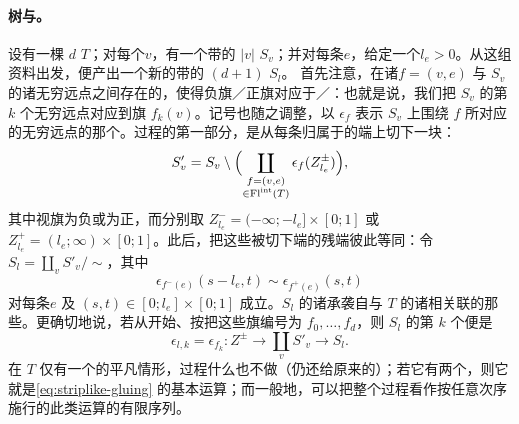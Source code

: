 \paragraph{树与\trGluing。}\label{sub:trees-gluing}
设有一棵 $d$ \trLeafedTree{}$T$；对每个\trVertex{}$v$，有一个带\trStriplikeEnd{}的
$|v|$ \trPointedDisc{}$S_v$；并对每条\trInteriorEdge{}$e$，给定一个\trGluingLength{}$l_e>0$。从这组资料出发，\trGluingConstruction{}便产出一个新的带\trStriplikeEnd{}的
$(d+1)$ \trPointedDisc{}$S_l$。
首先注意，在诸\trFlag{}$f=(v,e)$ 与 $S_v$ 的诸无穷远点之间存在\trCanonical{}的\trBijective，使得负旗／正旗对应于\trIncomingPoint{}／\trOutgoingPoint：也就是说，我们把 $S_v$ 的第 $k$ 个无穷远点对应到旗 $f_k(v)$。记号也随之调整，以 $\epsilon_f$ 表示 $S_v$ 上围绕 $f$ 所对应的无穷远点的那个\trStriplikeEnd。\trGluing{}过程的第一部分，是从每条归属于\trInteriorFlag{}的端上切下一块：
\begin{equation}\label{eq:gluing-cut}
S'_v=S_v\setminus\Bigl(\coprod_{\substack{f=(v,e)\\ \in\mathrm{Fl}^{\mathrm{int}}(T)}}\epsilon_f(Z^{\pm}_{l_e})\Bigr),
\end{equation}
其中视旗为负或为正，而分别取 $Z^{-}_{l_e}=(-\infty;-l_e]\times[0;1]$ 或
$Z^{+}_{l_e}=(l_e;\infty)\times[0;1]$。此后，把这些被切下端的残端彼此等同：令
$S_l=\coprod_v S'_v/\sim$，其中
\begin{equation}\label{eq:gluing-identify}
\epsilon_{f^-(e)}(s-l_e,t)\sim\epsilon_{f^+(e)}(s,t)
\end{equation}
对每条\trInteriorEdge{}$e$ 及 $(s,t)\in[0;l_e]\times[0;1]$ 成立。$S_l$ 的诸\trStriplikeEnd{}承袭自与 $T$ 的诸\trExteriorFlag{}相关联的那些。更确切地说，若从\trRoot{}开始、按\trCyclicOrder{}把这些旗编号为 $f_0,\ldots,f_d$，则 $S_l$ 的第 $k$ 个\trStriplikeEnd{}便是
\begin{equation}\label{eq:gluing-end}
\epsilon_{l,k}=\epsilon_{f_k}:Z^{\pm}\longrightarrow\coprod_v S'_v\longrightarrow S_l.
\end{equation}
在 $T$ 仅有一个\trVertex{}的平凡情形，\trGluing{}过程什么也不做（仍还给原来的\trSurface）；若它有两个\trVertex，则它就是\eqref{eq:striplike-gluing} 的基本\trConnectedSum{}运算；而一般地，可以把整个过程看作按任意次序施行的此类运算的有限序列。
